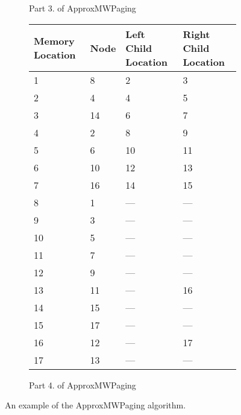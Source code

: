 \documentclass[]{beamer}
\theoremstyle{plain}
\begin{document}
\begin{frame}[fragile]
\begin{figure}[H]
\begin{center}
\begin{subfigure}[b]{0.72\textwidth}
\caption{Part 3. of ApproxMWPaging}



\end{subfigure}
\end{center}


\begin{center}
\scriptsize

\begin{subfigure}[b]{0.72\textwidth}


\begin{center}
    \begin{tabular}{ | l | l | l | p{5cm} |}
    \hline
    Memory Location & Node & Left Child Location & Right Child Location \\ \hline
    1  & 8  & 2    & 3    \\ \hline
    2  & 4  & 4    & 5    \\ \hline
    3  & 14 & 6    & 7    \\ \hline
    4  & 2  & 8    & 9    \\ \hline
    5  & 6  & 10   & 11   \\ \hline
    6  & 10 & 12   & 13   \\ \hline
    7  & 16 & 14   & 15   \\ \hline
    8  & 1  & --- & --- \\ \hline
    9  & 3  & --- & --- \\ \hline
    10 & 5  & --- & --- \\ \hline
    11 & 7  & --- & --- \\ \hline
    12 & 9  & --- & --- \\ \hline
    13 & 11 & --- & 16   \\ \hline
    14 & 15 & --- & --- \\ \hline
    15 & 17 & --- & --- \\ \hline
    16 & 12 & --- & 17   \\ \hline
    17 & 13 & --- & --- \\ \hline
    \end{tabular}
\end{center}

\caption{Part 4. of ApproxMWPaging}
\end{subfigure}
\end{center}


\caption{An example of the ApproxMWPaging algorithm.}
\end{figure}
\end{frame}
\end{document}
